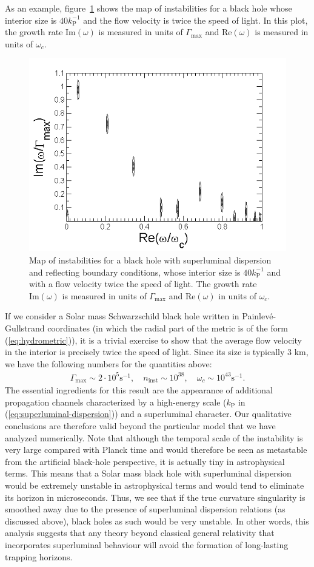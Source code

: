 \documentclass[12pt]{article}
\begin{document}
As an example,
figure~\ref{fig:refl-v2-l40} shows the map of instabilities for a black hole
whose interior size is $40 k_\text{P}^{-1}$ and the flow velocity is twice the speed of
light. In this plot, the growth rate $\text{Im}(\omega)$ is measured in units of
$\Gamma_\text{max}$ and $\text{Re}(\omega)$ is measured in units of $\omega_c$.
%

\begin{figure}
\begin{center}
\includegraphics[width=0.6\columnwidth]{refl-v2-l40}
  \caption{Map of instabilities for a black hole with superluminal dispersion and 
reflecting boundary conditions, whose interior size is $40 k_\text{P}^{-1}$ and with a flow velocity
twice the speed of light. The growth rate $\text{Im}(\omega)$ is measured in units of
$\Gamma_\text{max}$ and $\text{Re}(\omega)$  in units of $\omega_c$.
}\label{fig:refl-v2-l40}
\end{center}
 \end{figure}
% 
If we consider a Solar mass Schwarzschild black hole written in
Painlev\'e-Gullstrand coordinates (in which the radial part of the metric is of
the form (\ref{eq:hydrometric})), it is a trivial exercise to show that the average flow velocity in the interior is
precisely twice the speed of light. Since its size is typically 3 km, we have
the following numbers for the quantities above:
 \begin{align}
 \Gamma_\text{max} \sim 2 \cdot 10^5 \text{s}^{-1},\quad
 n_\text{inst}\sim 10^{38},\quad
 \omega_c\sim 10^{43} \text{s}^{-1}.
 \end{align}
%
The essential ingredients for this result are the appearance of additional propagation channels characterized by a high-energy scale ($k_\text{P}$ in (\ref{eq:superluminal-dispersion})) and a superluminal character. Our qualitative conclusions are therefore valid beyond the particular model that we have analyzed numerically. Note that although the temporal scale of the instability is very large compared with Planck time and  would therefore be seen as metastable from the artificial black-hole perspective,  it is actually tiny in astrophysical terms. This means that a Solar mass black hole with superluminal dispersion would be extremely unstable in astrophysical terms and would tend to eliminate its horizon in  microseconds.  Thus, we see that if the true curvature singularity is smoothed away due to the presence of superluminal dispersion relations (as discussed above), black
holes as such would be very unstable. In other words, this analysis suggests that any theory beyond classical general relativity that incorporates superluminal behaviour will avoid the formation of
long-lasting trapping horizons.  
\end{document}
